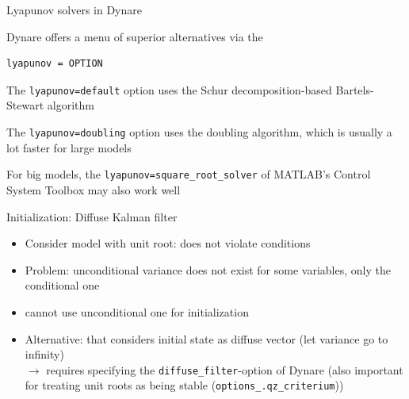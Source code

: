 \documentclass[handout,usepdftitle=false,xcolor=dvipsnames,aspectratio=169]{beamer}
\begin{document}
\begin{frame}[fragile]{Lyapunov solvers in Dynare}
  \begin{witemize}
    \item Dynare offers a menu of superior alternatives via the
    \begin{verbatim}
lyapunov = OPTION
  \end{verbatim}
    \item The \texttt{lyapunov=default} option uses the Schur decomposition-based Bartels-Stewart algorithm
    \item  The \texttt{lyapunov=doubling} option uses the doubling algorithm, which is usually a lot faster for large models
    \item For big models, the \texttt{lyapunov=square\_root\_solver} of MATLAB's Control System Toolbox may also work well
  \end{witemize}
\end{frame}

\begin{frame}{Initialization: Diffuse Kalman filter}
  \begin{itemize}
    \item Consider model with unit root: does not violate \textcite{BlanchardKahn1980} conditions\vspace{0.2cm}
    \item Problem: unconditional variance does not exist for some variables, only the conditional one\vspace{0.2cm}
    \item[$\rightarrow$] cannot use unconditional one for initialization\vspace{0.2cm}
    \item Alternative:  \parencite{Dejong1991,KoopmanDurbin2003} that considers initial state as diffuse vector (let variance go to infinity)\vspace{0.2cm}\\
          $\rightarrow$ requires specifying the \texttt{diffuse\_filter}-option of Dynare (also important for treating unit roots as being stable (\texttt{options\_.qz\_criterium}))

  \end{itemize}
\end{frame}
\end{document}
